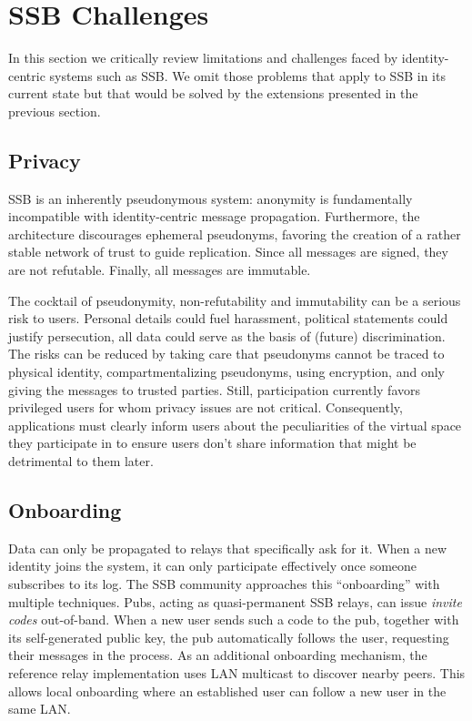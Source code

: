 \documentclass[9pt,sigconf]{acmart}
\begin{document}
%

\section{SSB Challenges}
\label{sect:nay}


In this section we critically review limitations and challenges faced by identity-centric systems such as SSB. We omit those problems that apply to SSB in its current state but that would be solved by the extensions presented in the previous section.

\subsection{Privacy}

SSB is an inherently pseudonymous system: anonymity is fundamentally incompatible with identity-centric message propagation. Furthermore, the architecture discourages ephemeral pseudonyms, favoring the creation of a rather stable network of trust to guide replication. Since all messages are signed, they are not refutable. Finally, all messages are immutable.

The cocktail of pseudonymity, non-refutability and immutability can be a serious risk to users. Personal details could fuel harassment, political statements could justify persecution, all data could serve as the basis of (future) discrimination. The risks can be reduced by taking care that pseudonyms cannot be traced to physical identity, compartmentalizing pseudonyms, using encryption, and only giving the messages to trusted parties. Still, participation currently favors privileged users for whom privacy issues are not critical. Consequently, applications must clearly inform users about the peculiarities of the virtual space they participate in to ensure users don't share information that might be detrimental to them later.

\subsection{Onboarding}

Data can only be propagated to relays that specifically ask for it. When a new identity joins the system, it can only participate effectively once someone subscribes to its log. The SSB community approaches this ``onboarding'' with multiple techniques. Pubs, acting as quasi-permanent SSB relays, can issue \textit{invite codes} out-of-band. When a new user sends such a code to the pub, together with its self-generated public key, the pub automatically follows the user, requesting their messages in the process. As an additional onboarding mechanism, the reference relay implementation uses LAN multicast to discover nearby peers. This allows local onboarding where an established user can follow a new user in the same LAN.
\end{document}
